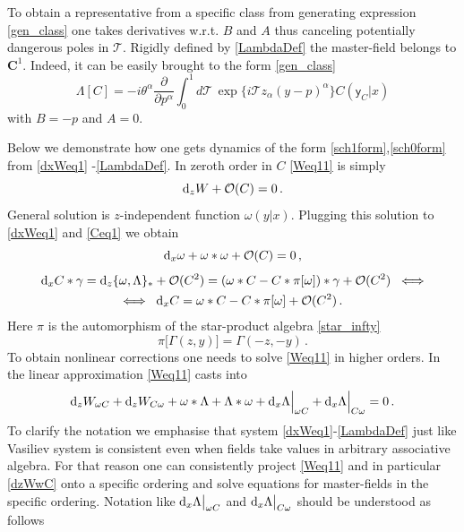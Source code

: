 \documentclass[12pt]{article}
\newcommand{\dr}{{{\rm d}}}
\newcommand{\go}{\omega}
\begin{document}
To obtain a representative from a specific class from generating expression \eqref{gen_class} one takes derivatives w.r.t. $B$ and $A$ thus canceling potentially dangerous poles in $\mathcal{T}$. Rigidly defined by \eqref{LambdaDef} the master-field belongs to $\mathbf{C}^1$. Indeed, it can be easily brought to the form \eqref{gen_class}
\begin{equation}
\Lambda[C]=-i\theta^\alpha \frac{\partial}{\partial p^\alpha}\int_0^1 d\mathcal{T}\, \exp\big\{i\mathcal{T}z_\alpha(y-p)^\alpha\big\}C(\mathsf{y}_C|x)
\end{equation}
with $B=-p$ and $A=0$.

Below we demonstrate how one gets dynamics of the form \eqref{sch1form},\eqref{sch0form} from \eqref{dxWeq1} -\eqref{LambdaDef}. In zeroth order in $C$ \eqref{Weq11} is simply
\begin{equation}
\dr_z W+\mathcal{O}(C)=0\,.
\end{equation}
General solution is $z$-independent function $\omega(y|x)$. Plugging this solution to \eqref{dxWeq1} and \eqref{Ceq1} we obtain
\begin{equation}\label{linear_one}
\dr_x \go+\go\ast \go +\mathcal{O}(C)=0\,,
\end{equation}
\begin{multline}\label{linear_zero}
\dr_x C\ast \gamma=\dr_z\{\go,\Lambda\}_\ast+\mathcal{O}(C^2)=(\go\ast C- C\ast \pi[\go])\ast \gamma+\mathcal{O}(C^2)\;\; \Longleftrightarrow\\
\Longleftrightarrow\;\; \dr_x C=\go\ast C-C\ast \pi[\go]+\mathcal{O}(C^2)\,.
\end{multline}
Here $\pi$ is the automorphism of the star-product algebra \eqref{star_infty}
\begin{equation}\label{automorphism}
\pi\big[\Gamma(z,y)\big]=\Gamma(-z,-y)\,.
\end{equation}
To obtain nonlinear corrections one needs to solve \eqref{Weq11} in higher orders. In the linear approximation \eqref{Weq11} casts into
\begin{equation}\label{dzWwC}
\dr_zW_{\go C}+\dr_z W_{C\go}+\go\ast \Lambda+\Lambda\ast \go+\dr_x\Lambda\Big|_{\go C}+\dr_x\Lambda\Big|_{C\go}=0\,.
\end{equation}
To clarify the notation we emphasise that system \eqref{dxWeq1}-\eqref{LambdaDef} just like Vasiliev system \cite{Vasiliev:1999ba} is consistent even when fields take values in arbitrary associative algebra. For that reason one can consistently project \eqref{Weq11} and in particular \eqref{dzWwC} onto a specific ordering and solve equations for master-fields in the specific ordering. Notation like $\dr_x\Lambda\big|_{\go C}$ and $\dr_x\Lambda\big|_{C\go}$ should be understood as follows
\end{document}
